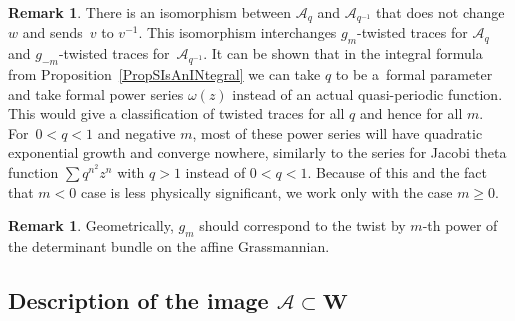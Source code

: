 \documentclass[pdftex]{sigma}
\newcommand{\mc}{\mathcal}
\numberwithin{equation}{section}
\theoremstyle{definition}
\newtheorem{Remark}[Theorem]{Remark}
\begin{document}
\begin{Remark}
 There is an isomorphism between $\mc{A}_q$ and $\mc{A}_{q^{-1}}$ that does not change $w$ and sends~$v$ to $v^{-1}$. This isomorphism interchanges $g_m$-twisted traces for $\mc{A}_q$ and $g_{-m}$-twisted traces for~$\mc{A}_{q^{-1}}$. It can be shown that in the integral formula from Proposition~\ref{PropSIsAnINtegral} we can take $q$ to be a~formal parameter and take formal power series $\omega(z)$ instead of an actual quasi-periodic function. This would give a classification of twisted traces for all $q$ and hence for all $m$. For~${0<q<1}$ and negative $m$, most of these power series will have quadratic exponential growth and converge nowhere, similarly to the series for Jacobi theta function $\sum q^{n^2}z^n$ with $q>1$ instead of $0<q<1$. Because of this and the fact that $m<0$ case is less physically significant, we work only with the case $m\geq 0$.
\end{Remark}
\begin{Remark}
 Geometrically, $g_m$ should correspond to the twist by $m$-th power of the determinant bundle on the affine Grassmannian.
\end{Remark}

\subsection[Description of the image A subset W]{Description of the image $\boldsymbol{\mc{A}\subset W}$}
\end{document}
